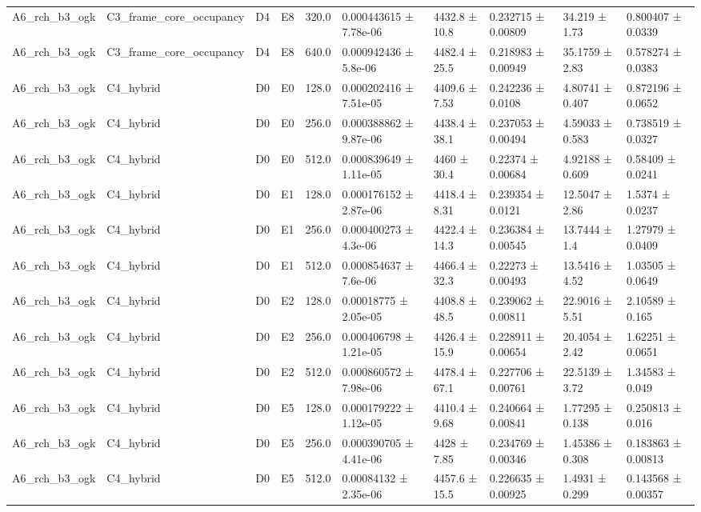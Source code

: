 \begin{table}
\begin{tabular}{llllllllll}
A6\_rch\_b3\_ogk & C3\_frame\_core\_occupancy & D4 & E8 & 320.0 & 0.000443615 ± 7.78e-06 & 4432.8 ± 10.8 & 0.232715 ± 0.00809 & 34.219 ± 1.73 & 0.800407 ± 0.0339 \\
A6\_rch\_b3\_ogk & C3\_frame\_core\_occupancy & D4 & E8 & 640.0 & 0.000942436 ± 5.8e-06 & 4482.4 ± 25.5 & 0.218983 ± 0.00949 & 35.1759 ± 2.83 & 0.578274 ± 0.0383 \\
A6\_rch\_b3\_ogk & C4\_hybrid & D0 & E0 & 128.0 & 0.000202416 ± 7.51e-05 & 4409.6 ± 7.53 & 0.242236 ± 0.0108 & 4.80741 ± 0.407 & 0.872196 ± 0.0652 \\
A6\_rch\_b3\_ogk & C4\_hybrid & D0 & E0 & 256.0 & 0.000388862 ± 9.87e-06 & 4438.4 ± 38.1 & 0.237053 ± 0.00494 & 4.59033 ± 0.583 & 0.738519 ± 0.0327 \\
A6\_rch\_b3\_ogk & C4\_hybrid & D0 & E0 & 512.0 & 0.000839649 ± 1.11e-05 & 4460 ± 30.4 & 0.22374 ± 0.00684 & 4.92188 ± 0.609 & 0.58409 ± 0.0241 \\
A6\_rch\_b3\_ogk & C4\_hybrid & D0 & E1 & 128.0 & 0.000176152 ± 2.87e-06 & 4418.4 ± 8.31 & 0.239354 ± 0.0121 & 12.5047 ± 2.86 & 1.5374 ± 0.0237 \\
A6\_rch\_b3\_ogk & C4\_hybrid & D0 & E1 & 256.0 & 0.000400273 ± 4.3e-06 & 4422.4 ± 14.3 & 0.236384 ± 0.00545 & 13.7444 ± 1.4 & 1.27979 ± 0.0409 \\
A6\_rch\_b3\_ogk & C4\_hybrid & D0 & E1 & 512.0 & 0.000854637 ± 7.6e-06 & 4466.4 ± 32.3 & 0.22273 ± 0.00493 & 13.5416 ± 4.52 & 1.03505 ± 0.0649 \\
A6\_rch\_b3\_ogk & C4\_hybrid & D0 & E2 & 128.0 & 0.00018775 ± 2.05e-05 & 4408.8 ± 48.5 & 0.239062 ± 0.00811 & 22.9016 ± 5.51 & 2.10589 ± 0.165 \\
A6\_rch\_b3\_ogk & C4\_hybrid & D0 & E2 & 256.0 & 0.000406798 ± 1.21e-05 & 4426.4 ± 15.9 & 0.228911 ± 0.00654 & 20.4054 ± 2.42 & 1.62251 ± 0.0651 \\
A6\_rch\_b3\_ogk & C4\_hybrid & D0 & E2 & 512.0 & 0.000860572 ± 7.98e-06 & 4478.4 ± 67.1 & 0.227706 ± 0.00761 & 22.5139 ± 3.72 & 1.34583 ± 0.049 \\
A6\_rch\_b3\_ogk & C4\_hybrid & D0 & E5 & 128.0 & 0.000179222 ± 1.12e-05 & 4410.4 ± 9.68 & 0.240664 ± 0.00841 & 1.77295 ± 0.138 & 0.250813 ± 0.016 \\
A6\_rch\_b3\_ogk & C4\_hybrid & D0 & E5 & 256.0 & 0.000390705 ± 4.41e-06 & 4428 ± 7.85 & 0.234769 ± 0.00346 & 1.45386 ± 0.308 & 0.183863 ± 0.00813 \\
A6\_rch\_b3\_ogk & C4\_hybrid & D0 & E5 & 512.0 & 0.00084132 ± 2.35e-06 & 4457.6 ± 15.5 & 0.226635 ± 0.00925 & 1.4931 ± 0.299 & 0.143568 ± 0.00357 \\

\end{tabular}
\end{table}
